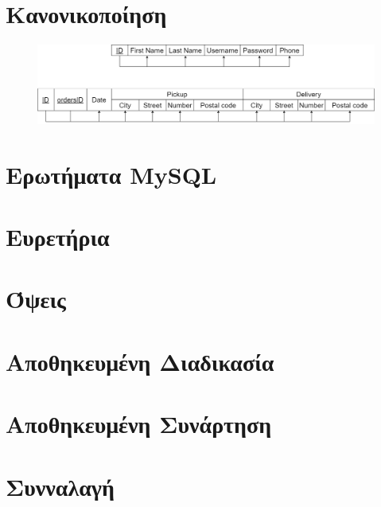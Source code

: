 \documentclass[12pt,a4paper, twoside, notitlepage]{report}
\begin{document}
\section{Κανονικοποίηση}

\begin{figure}[h]
  \centering
      \includegraphics[width=1\textwidth]{images/diagram4.png}
  \captionsetup{labelfont=bf}
\end{figure}

\section{Ερωτήματα \foreignlanguage{english}{MySQL}}


\section{Ευρετήρια}



\section{Όψεις}



\section{Αποθηκευμένη Διαδικασία}



\section{Αποθηκευμένη Συνάρτηση}



\section{Συνναλαγή}

\end{document}
